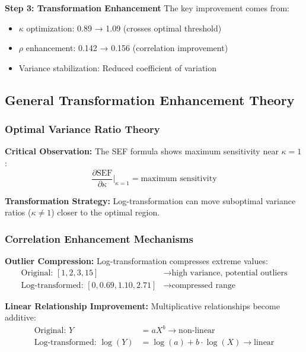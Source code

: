 \textbf{Step 3: Transformation Enhancement}
The key improvement comes from:
\begin{itemize}
    \item $\kappa$ optimization: 0.89 → 1.09 (crosses optimal threshold)
    \item $\rho$ enhancement: 0.142 → 0.156 (correlation improvement)
    \item Variance stabilization: Reduced coefficient of variation
\end{itemize}

\subsection{General Transformation Enhancement Theory}

\subsubsection{Optimal Variance Ratio Theory}

\textbf{Critical Observation:} The SEF formula shows maximum sensitivity near $\kappa = 1$:
\begin{equation}
\frac{\partial \text{SEF}}{\partial \kappa}\bigg|_{\kappa=1} = \text{maximum sensitivity}
\end{equation}

\textbf{Transformation Strategy:} Log-transformation can move suboptimal variance ratios ($\kappa \neq 1$) closer to the optimal region.

\subsubsection{Correlation Enhancement Mechanisms}

\textbf{Outlier Compression:} Log-transformation compresses extreme values:
\begin{align}
\text{Original: } [1, 2, 3, 15] &\rightarrow \text{high variance, potential outliers} \\
\text{Log-transformed: } [0, 0.69, 1.10, 2.71] &\rightarrow \text{compressed range}
\end{align}

\textbf{Linear Relationship Improvement:} Multiplicative relationships become additive:
\begin{align}
\text{Original: } Y &= aX^b \rightarrow \text{non-linear} \\
\text{Log-transformed: } \log(Y) &= \log(a) + b \cdot \log(X) \rightarrow \text{linear}
\end{align}


